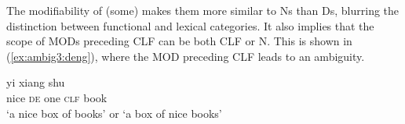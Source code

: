 \documentclass[output=paper,colorlinks,citecolor=brown]{langscibook}
\begin{document}
\z 	

\noindent The modifiability of (some)  makes them more similar to Ns than Ds, blurring the distinction between functional and lexical categories.  
%
It also implies that the scope of MODs preceding CLF can be both CLF or N. %
This is shown in (\ref{ex:ambig3:deng}), where the MOD preceding CLF leads to an ambiguity.

	
%

\ea \label{ex:ambig3:deng}
\gll  {}  yi xiang shu\\
nice \textsc{de} one \textsc{clf} book\\
\glt `a nice box of books' or `a box of nice books'
\z 


\end{document}
